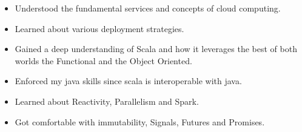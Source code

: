 \documentclass[10pt,a4paper,ragged2e,withhyper]{altacv}
\begin{document}
\begin{paracol}{2}
   \begin{itemize}
      \item Understood the fundamental services and concepts of cloud computing.
      \item Learned about various deployment strategies.
   \end{itemize}

   \divider


   \begin{itemize}
      \item Gained a deep understanding of Scala and how it leverages the best of both worlds the Functional and the Object Oriented.
      \item Enforced my java skills since scala is interoperable with java.
      \item Learned about Reactivity, Parallelism and Spark.
      \item Got comfortable with immutability, Signals, Futures and Promises.
   \end{itemize}







\end{paracol}
\end{document}
